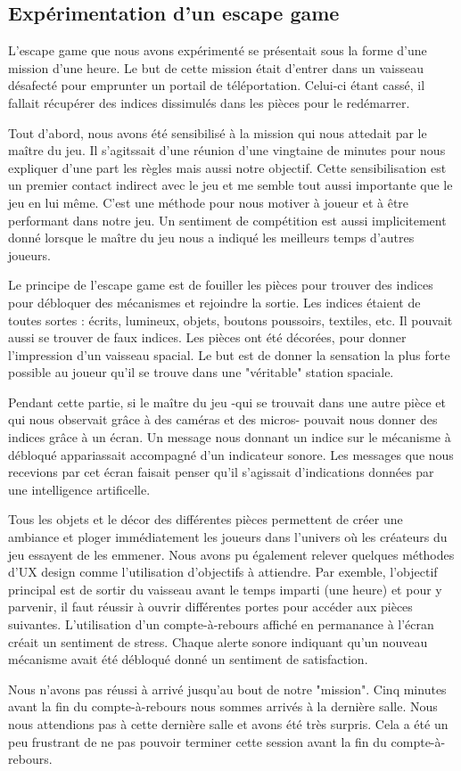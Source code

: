 \documentclass{article}
\begin{document}
	\subsection{Expérimentation d'un escape game}\label{sec:expescape}
		L'escape game que nous avons expérimenté se présentait sous la forme d'une mission d'une heure.
		Le but de cette mission était d'entrer dans un vaisseau désafecté pour emprunter un portail de téléportation.
		Celui-ci étant cassé, il fallait récupérer des indices dissimulés dans les pièces pour le redémarrer.\par
		Tout d'abord, nous avons été sensibilisé à la mission qui nous attedait par le maître du jeu. 
		Il s'agitssait d'une réunion d'une vingtaine de minutes pour nous expliquer d'une part les règles mais aussi notre objectif.
		Cette sensibilisation est un premier contact indirect avec le jeu et me semble tout aussi importante que le jeu en lui même.
		C'est une méthode pour nous motiver à joueur et à être performant dans notre jeu.
		Un sentiment de compétition est aussi implicitement donné lorsque le maître du jeu nous a indiqué les meilleurs temps d'autres joueurs.\par
		Le principe de l'escape game est de fouiller les pièces pour trouver des indices pour débloquer des mécanismes et rejoindre la sortie.
		Les indices étaient de toutes sortes : écrits, lumineux, objets, boutons poussoirs, textiles, etc.
		Il pouvait aussi se trouver de faux indices.
		Les pièces ont été décorées, pour donner l'impression d'un vaisseau spacial.
		Le but est de donner la sensation la plus forte possible au joueur qu'il se trouve dans une "véritable" station spaciale.\par
		Pendant cette partie, si le maître du jeu -qui se trouvait dans une autre pièce et qui nous observait grâce à des caméras et des micros- pouvait nous donner des indices grâce à un écran.
		Un message nous donnant un indice sur le mécanisme à débloqué appariassait accompagné d'un indicateur sonore.
		Les messages que nous recevions par cet écran faisait penser qu'il s'agissait d'indications données par une intelligence artificelle.\par
		Tous les objets et le décor des différentes pièces permettent de créer une ambiance et ploger immédiatement les joueurs dans l'univers où les créateurs du jeu essayent de les emmener.
		Nous avons pu également relever quelques méthodes d'UX design comme l'utilisation d'objectifs à attiendre.
		Par exemble, l'objectif principal est de sortir du vaisseau avant le temps imparti (une heure) et pour y parvenir, il faut réussir à ouvrir différentes portes pour accéder aux pièces suivantes.
		L'utilisation d'un compte-à-rebours affiché en permanance à l'écran créait un sentiment de stress.
		Chaque alerte sonore indiquant qu'un nouveau mécanisme avait été débloqué donné un sentiment de satisfaction.\par
		Nous n'avons pas réussi à arrivé jusqu'au bout de notre "mission". Cinq minutes avant la fin du compte-à-rebours nous sommes arrivés à la dernière salle.
		Nous nous attendions pas à cette dernière salle et avons été très surpris.
		Cela a été un peu frustrant de ne pas pouvoir terminer cette session avant la fin du compte-à-rebours.
\end{document}
